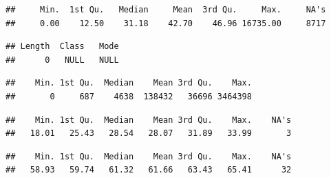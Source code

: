 \documentclass[12pt,]{article}
\newenvironment{Shaded}{\begin{snugshade}}{\end{snugshade}}
\newcommand{\KeywordTok}[1]{\textcolor[rgb]{0.13,0.29,0.53}{\textbf{#1}}}
\newcommand{\OperatorTok}[1]{\textcolor[rgb]{0.81,0.36,0.00}{\textbf{#1}}}
\newcommand{\NormalTok}[1]{#1}
\begin{document}
\begin{verbatim}
##     Min.  1st Qu.   Median     Mean  3rd Qu.     Max.     NA's 
##     0.00    12.50    31.18    42.70    46.96 16735.00     8717
\end{verbatim}

\begin{Shaded}
\end{Shaded}

\begin{verbatim}
## Length  Class   Mode 
##      0   NULL   NULL
\end{verbatim}

\begin{Shaded}
\end{Shaded}

\begin{verbatim}
##    Min. 1st Qu.  Median    Mean 3rd Qu.    Max. 
##       0     687    4638  138432   36696 3464398
\end{verbatim}

\begin{Shaded}
\end{Shaded}

\begin{verbatim}
##    Min. 1st Qu.  Median    Mean 3rd Qu.    Max.    NA's 
##   18.01   25.43   28.54   28.07   31.89   33.99       3
\end{verbatim}

\begin{Shaded}
\end{Shaded}

\begin{verbatim}
##    Min. 1st Qu.  Median    Mean 3rd Qu.    Max.    NA's 
##   58.93   59.74   61.32   61.66   63.43   65.41      32
\end{verbatim}
\end{document}
